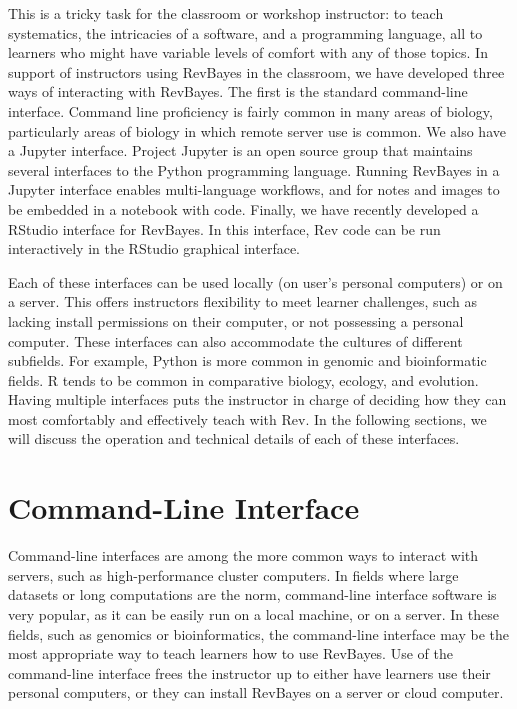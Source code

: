 \documentclass{article}
\begin{document}
This is a tricky task for the classroom or workshop instructor: to teach systematics, the intricacies of a software, and a programming language, all to learners who might have variable levels of comfort with any of those topics.
In support of instructors using RevBayes in the classroom, we have developed three ways of interacting with RevBayes.
The first is the standard command-line interface.
Command line proficiency is fairly common in many areas of biology, particularly areas of biology in which remote server use is common.
We also have a Jupyter interface.
Project Jupyter is an open source group that maintains several interfaces to the Python programming language.
Running RevBayes in a Jupyter interface enables multi-language workflows, and for notes and images to be embedded in a notebook with code.
Finally, we have recently developed a RStudio interface for RevBayes. 
In this interface, Rev code can be run interactively in the RStudio graphical interface.

Each of these interfaces can be used locally (on user's personal computers) or on a server.
This offers instructors flexibility to meet learner challenges, such as lacking install permissions on their computer, or not possessing a personal computer.
These interfaces can also accommodate the cultures of different subfields.
For example, Python is more common in genomic and bioinformatic fields.
R tends to be common in comparative biology, ecology, and evolution. 
Having multiple interfaces puts the instructor in charge of deciding how they can most comfortably and effectively teach with Rev.
In the following sections, we will discuss the operation and technical details of each of these interfaces.

\section{Command-Line Interface}

Command-line interfaces are among the more common ways to interact with servers, such as high-performance cluster computers.
In fields where large datasets or long computations are the norm, command-line interface software is very popular, as it can be easily run on a local machine, or on a server.
In these fields, such as genomics or bioinformatics, the command-line interface may be the most appropriate way to teach learners how to use RevBayes.
Use of the command-line interface frees the instructor up to either have learners use their personal computers, or they can install RevBayes on a server or cloud computer.
\end{document}

